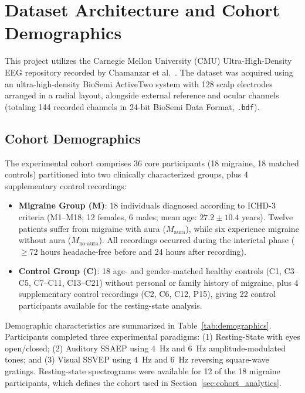 \documentclass[12pt, a4paper]{report}
\begin{document}
\section{Dataset Architecture and Cohort Demographics}
\label{sec:dataset_architecture}
This project utilizes the Carnegie Mellon University (CMU) Ultra-High-Density EEG repository recorded by Chamanzar et al.~\cite{chamanzar2021uhd}. The dataset was acquired using an ultra-high-density BioSemi ActiveTwo system with 128 scalp electrodes arranged in a radial layout, alongside external reference and ocular channels (totaling 144 recorded channels in 24-bit BioSemi Data Format, \texttt{.bdf}).

\subsection{Cohort Demographics}
The experimental cohort comprises 36 core participants (18 migraine, 18 matched controls) partitioned into two clinically characterized groups, plus 4 supplementary control recordings:
\begin{itemize}
\item \textbf{Migraine Group ($\boldsymbol{M}$)}: 18 individuals diagnosed according to ICHD-3 criteria (M1--M18; 12 females, 6 males; mean age: $27.2 \pm 10.4$ years). Twelve patients suffer from migraine with aura ($M_{\text{aura}}$), while six experience migraine without aura ($M_{\text{no-aura}}$). All recordings occurred during the interictal phase ($\ge 72$ hours headache-free before and 24 hours after recording).
\item \textbf{Control Group ($\boldsymbol{C}$)}: 18 age- and gender-matched healthy controls (C1, C3--C5, C7--C11, C13--C21) without personal or family history of migraine, plus 4 supplementary control recordings (C2, C6, C12, P15), giving 22 control participants available for the resting-state analysis.
\end{itemize}

Demographic characteristics are summarized in Table~\ref{tab:demographics}. Participants completed three experimental paradigms: (1) Resting-State with eyes open/closed; (2) Auditory SSAEP using 4~Hz and 6~Hz amplitude-modulated tones; and (3) Visual SSVEP using 4~Hz and 6~Hz reversing square-wave gratings. Resting-state spectrograms were available for 12 of the 18 migraine participants, which defines the cohort used in Section~\ref{sec:cohort_analytics}.

\vspace{2em}
\end{document}
